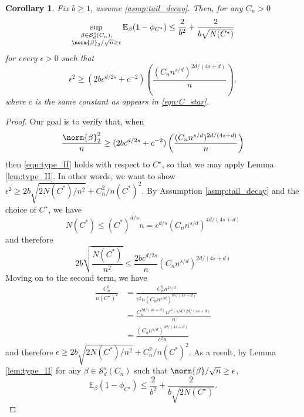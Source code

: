 \documentclass{article}
\newcommand{\1}{\mathbf{1}}
\newcommand{\Ebb}{\mathbb{E}}
\theoremstyle{alden}
\theoremstyle{aldenthm}
\newtheorem{corollary}{Corollary}
\theoremstyle{definition}
\theoremstyle{remark}
\begin{document}
\begin{corollary}
	\label{cor:critical_radius}
	Fix $b \geq 1$, assume \ref{asmp:tail_decay}. Then, for any $C_n > 0$
	\begin{equation*}
	\sup_{\substack{\beta \in \mathcal{S}_d^{s}(C_n), \\ \norm{\beta}_2/\sqrt{n} \geq \epsilon}} \Ebb_{\beta}(1 - \phi_{C^{\star}}) \leq \frac{2}{b^2} + \frac{2}{b\sqrt{N(C^{\star})}}
	\end{equation*}
	for every $\epsilon > 0$ such that 
	\begin{equation*}
	\epsilon^2 \geq (2bc^{d/2s} + c^{-2}) \left(\frac{(C_n n^{s/d})^{2d/(4s + d)}}{n}\right),
	\end{equation*}
	where $c$ is the same constant as appears in \eqref{eqn:C_star}.
\end{corollary}
\begin{proof}
	Our goal is to verify that, when
	\begin{equation*}
	\frac{\norm{\beta}_2^2}{n} \geq (2bc^{d/2s} + c^{-2}) \left(\frac{(C_n n^{s/d})^{2d/(4s + d)}}{n}\right)
	\end{equation*} 
	then \eqref{eqn:type_II} holds with respect to $C^{\star}$, so that we may apply Lemma \ref{lem:type_II}. In other words, we want to show $\epsilon^2 \geq 2b\sqrt{2N(C^*)/n^2} + C_n^2/n(C^*)^2$. By Assumption \ref{asmp:tail_decay} and the choice of $C^{\star}$, we have
	\begin{equation*}
	N(C^*) \leq (C^*)^{d/s}n = c^{d/s}(C_n n^{s/d})^{4d/(4s + d)}
	\end{equation*}
	and therefore
	\begin{equation*}
	2b\sqrt{\frac{N(C^*)}{n^2}} \leq \frac{2bc^{d/2s}}{n} (C_n n^{s/d})^{2d/(4s+d)}
	\end{equation*}
	Moving on to the second term, we have
	\begin{align*}
	\frac{C_n^2}{n(C^{\star})^2} & = \frac{C_n^2n^{2s/d}}{c^2n(C_nn^{s/d})^{8s/(4s+d)}} \\
	& = \frac{C_n^{2d/(4s + d)}n^{c^2(s/d)2d/(4s + d)}}{n} \\
	& = \frac{(C_n n^{s/d})^{2d/(4s + d)}}{c^2n}
	\end{align*}
	and therefore $\epsilon \geq 2b\sqrt{2N(C^*)/n^2} + C_n^2/n(C^*)^2$. As a result, by Lemma \ref{lem:type_II} for any $\beta \in \mathcal{S}^s_d(C_n)$ such that $\norm{\beta}/\sqrt{n} \geq \epsilon$, 
	\begin{equation*}
	\Ebb_{\beta}(1 - \phi_{C^{\star}}) \leq \frac{2}{b^2} + \frac{2}{b\sqrt{2N(C^{\star})}}.
	\end{equation*}
\end{proof}
\end{document}
